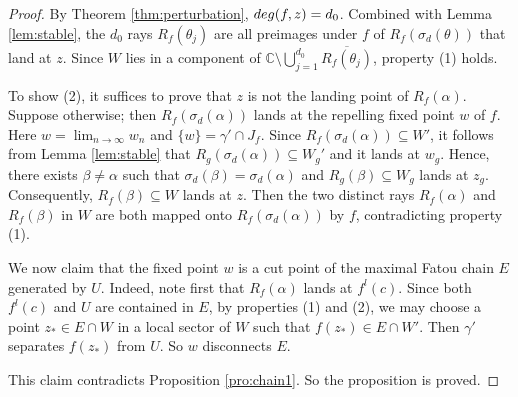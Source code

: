 \documentclass[10pt,a4paper]{amsart}
\def\C{\mbox{$\mathbb C$}}
\def\g{\gamma}
\begin{document}
\begin{proof}
	By Theorem \ref{thm:perturbation}, ${\rm deg}(f,  z)=d_0$. Combined with Lemma \ref{lem:stable}, the $d_0$ rays $R_f(\theta_j)$ are all preimages under $f$ of $R_f(\sigma_d(\theta))$ that land at $z$. Since $W$ lies in a component of $\C\setminus\bigcup_{j=1}^{d_0}\overline{R_f(\theta_j)}$, property (1) holds.\vspace{2pt}
	
	To show (2), it suffices to prove that $z$ is not the landing point of $R_f(\alpha)$. Suppose otherwise; then $R_f(\sigma_d(\alpha))$ lands at the repelling fixed point $w$ of $f$. Here $w=\lim_{n\to\infty} w_n$ and $\{w\}=\gamma'\cap J_f$. Since $R_f(\sigma_d(\alpha))\subseteq W'$, it follows from Lemma \ref{lem:stable} that $R_g(\sigma_d(\alpha))\subseteq W_g'$ and  it lands at $w_g$. Hence, there exists $\beta\neq \alpha$ such that $\sigma_d(\beta)=\sigma_d(\alpha)$ and $R_g(\beta)\subseteq W_g$ lands at $z_g$.  Consequently, $R_f(\beta)\subseteq W$ lands at $z$.
	Then the two distinct rays $R_f(\alpha)$ and $R_f(\beta)$ in $W$  are both mapped onto $R_f(\sigma_d(\alpha))$ by $f$, contradicting property (1).\vspace{2pt}
	
	
	We now claim that the fixed point $w$ is a cut point of the maximal Fatou chain $E$ generated by $U$. Indeed,  note first that $R_f(\alpha)$ lands at $f^l(c)$. Since both $f^l(c)$ and $ U$ are contained in $E$, by properties (1) and (2), we may choose a point $z_*\in E\cap W$ in a local sector of $W$ such that $f(z_*)\in E\cap W'$. Then $\g'$ separates $f(z_*)$ from $ U$. So $w$ disconnects $E$.
	
	This claim contradicts Proposition \ref{pro:chain1}. So the  proposition is proved.
\end{proof}
\end{document}
